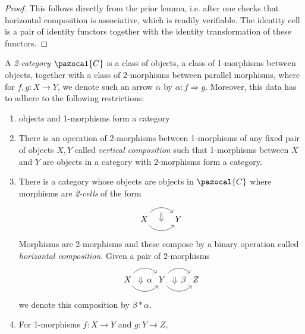 \begin{proof}
    This follows directly from the prior lemma, i.e. after one checks that horizontal composition is associative, which is readily verifiable. The identity cell is a pair of identity functors together with the identity transformation of these functors. 
\end{proof}
\begin{definition}
    A \emph{2-category} $\pazocal{C}$ is a class of objects, a class of 1-morphisms between objects, together with a class of 2-morphisms between parallel morphisms, where for $f,g : X\rightarrow Y$, we denote such an arrow $\alpha$ by $\alpha : f\Rightarrow g$. Moreover, this data has to adhere to the following restrictions: 
    \begin{enumerate}
        \item objects and 1-morphisms form a category
        \item There is an operation of 2-morphisms between 1-morphisms of any fixed pair of objects $X,Y$ called \emph{vertical composition} such that 1-morphisms between $X$ and $Y$ are objects in a category with $2$-morphisms form a category. 
        \item There is a category whose objects are objects in $\pazocal{C}$ where morphisms are \emph{2-cells} of the form 
        $$
            \begin{tikzcd}
                X \arrow[r, bend right=50,""{name=a}] \arrow[r,bend left=50,""{name=b}] & Y \arrow[Rightarrow,from=b, to=a,shorten <= 6, shorten >= 6]
            \end{tikzcd}
        $$
        Morphisms are 2-morphisms and these compose by a binary operation called \emph{horizontal composition}. Given a pair of $2$-morphisms
        $$
            \begin{tikzcd}
                X
                \arrow[r, bend left=50]
                \arrow[r, bend right=50]
                \arrow[phantom, from=1-1, to=1-2, "\Downarrow\,\alpha" description,
                shorten >=4pt, shorten <=4pt]
                & Y
                \arrow[r, bend left=50]
                \arrow[r, bend right=50]
                \arrow[phantom, from=1-2, to=1-3, "\Downarrow\,\beta" description,
                shorten >=4pt, shorten <=4pt]
                & Z
            \end{tikzcd}
        $$
        we denote this composition by $\beta\ast\alpha$.
        \item For 1-morphisms $f : X\rightarrow Y$ and $g: Y\rightarrow Z$, 

\end{enumerate}
\end{definition}

